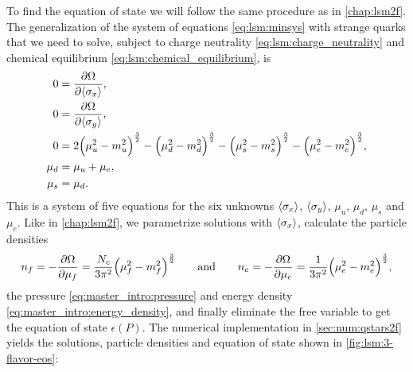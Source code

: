 To find the equation of state we will follow the same procedure as in \cref{chap:lsm2f}.
The generalization of the system of equations \eqref{eq:lsm:minsys} with strange quarks that we need to solve,
subject to charge neutrality \eqref{eq:lsm:charge_neutrality} and chemical equilibrium \eqref{eq:lsm:chemical_equilibrium},
is
\begin{subequations}
\begin{align}
	0 &= \pdv{\Omega}{ \langle \sigma_x \rangle} , \label{eq:lsm3f:minsys_minx} \\
	0 &= \pdv{\Omega}{ \langle \sigma_y \rangle} , \label{eq:lsm3f:minsys_miny} \\
	0 &= 2 \Big(\mu_u^2-m_u^2\Big)^\frac32 - \Big(\mu_d^2-m_d^2\Big)^\frac32 - \Big(\mu_s^2-m_s^2\Big)^\frac32 - \Big(\mu_e^2-m_e^2\Big)^\frac32 \label{eq:lsm:minsys3f_charge}, \\
	\mu_d &= \mu_u + \mu_e, \\
	\mu_s &= \mu_d .
\end{align}%
\label{eq:lsm3f:minsys}%
\end{subequations}%
This is a system of five equations for the six unknowns
$\langle \sigma_x \rangle$, $\langle \sigma_y \rangle$, $\mu_u$, $\mu_d$, $\mu_s$ and $\mu_e$.
Like in \cref{chap:lsm2f},
we parametrize solutions with $\langle \sigma_x \rangle$,
calculate the particle densities
\begin{equation}
	n_f = -\pdv{\Omega}{\mu_f} = \frac{N_c}{3 \pi^2} \Big( \mu_f^2 - m_f^2 \Big)^{\frac32}
	\qquad \text{and} \qquad
	n_e = -\pdv{\Omega}{\mu_e} = \frac{  1}{3 \pi^2} \Big( \mu_e^2 - m_e^2 \Big)^{\frac32},
\label{eq:lsm3f:particle_densities}
\end{equation}%
the pressure \eqref{eq:master_intro:pressure} and energy density \eqref{eq:master_intro:energy_density}, and finally eliminate the free variable to get the equation of state $\epsilon(P)$.
The numerical implementation in \cref{sec:num:qstars2f} yields
the solutions, particle densities and equation of state shown in \cref{fig:lsm:3-flavor-eos}:
